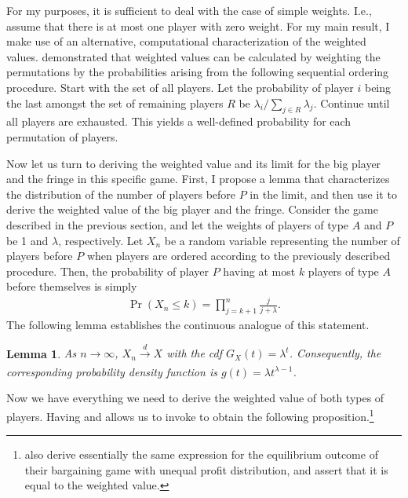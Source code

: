 \documentclass[a4paper]{article}
\newtheorem{lemma}{Lemma}
\begin{document}
For my purposes, it is sufficient to deal with the case of simple weights.
I.e., assume that there is at most one player with zero weight.
For my main result, I make use of an alternative, computational characterization of the weighted values. 
\textcite{kalai1987weighted} demonstrated that weighted values can be calculated by weighting the permutations by the probabilities arising from the following sequential ordering procedure.
Start with the set of all players.
Let the probability of player $i$ being the last amongst the set of remaining players $R$ be $\lambda_i / \sum_{j \in R} \lambda_j$.
Continue until all players are exhausted.
This yields a well-defined probability for each permutation of players.

Now let us turn to deriving the weighted value and its limit for the big player and the fringe in this specific game.
First, I propose a lemma that characterizes the distribution of the number of players before $P$ in the limit, and then use it to derive the weighted value of the big player and the fringe.
Consider the game described in the previous section, and let the weights of players of type $A$ and $P$ be 1 and $\lambda$, respectively.
Let $X_n$ be a random variable representing the number of players before $P$ when players are ordered according to the previously described procedure.
Then, the probability of player $P$ having at most $k$ players of type $A$ before themselves is simply
\begin{align}
    \label{eq:entry_distr_discrete}
    \Pr(X_n \leq k) = \prod_{j=k+1}^n \frac{j}{j + \lambda}.
\end{align}
The following lemma establishes the continuous analogue of this statement.
\begin{lemma}
    \label{lem:entry_distr}
     As $n \to \infty$, $X_n \xrightarrow[]{d} X$ with the cdf $G_X(t) = \lambda^t$.
     Consequently, the corresponding probability density function is $g(t) = \lambda t^{\lambda - 1}$.
\end{lemma}

Now we have everything we need to derive the weighted value of both types of players.
Having  and  allows us to invoke  to obtain the following proposition.\footnote{
    \textcite{stole1996intra} also derive essentially the same expression for the equilibrium outcome of their bargaining game with unequal profit distribution, and assert that it is equal to the weighted value.
}
\end{document}
